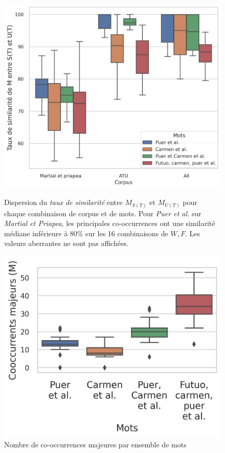 \begin{figure}[h]
    \begin{minipage}[t]{.55\linewidth}
        \centering
        \includegraphics[width=1\linewidth]{figures/chap1/part2/classes_percent.png}
        \caption{Dispersion du \textit{taux de similarité} entre $M_{S(T)}$ et $M_{U(T)}$ pour chaque combinaison de corpus et de mots. Pour \textit{Puer et al.} sur \textit{Martial et Priapea}, les principales co-occurrences ont une similarité médiane inférieure à 80\% sur les 16 combinaisons de $W,F$. Les valeurs aberrantes ne sont pas affichées.}
        \label{fig:classes_de_violon}
    \end{minipage}%
    \hfill%
    \begin{minipage}[t]{.43\linewidth}
        \centering
        \includegraphics[width=\linewidth]{figures/chap1/part2/major_count.png}
        \caption{Nombre de co-occurrences majeures par ensemble de mots}
        \label{fig:chap1:noise:major_count}
    \end{minipage}
\end{figure}




